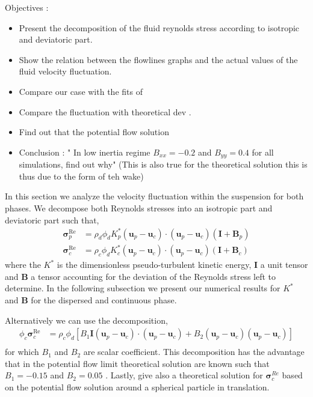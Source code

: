 
Objectives : 
\begin{itemize}
    \item Present the decomposition of the fluid reynolds stress according to isotropic and deviatoric part.
    \item Show the relation between the flowlines graphs and the actual values of the fluid velocity fluctuation.
    \item Compare our case with the fits of  \citet{almeras2019fluctuations} 
    \item Compare the fluctuation with theoretical dev \citet{lance1991turbulence,zhang1994ensemble}. 
    \item Find out that the potential flow solution 
    \item Conclusion : " In low inertia regime $B_{xx} = - 0.2$ and $B_{yy} = 0.4$ for all simulations, find out why" (This is also true for the theoretical solution\citep{lance1991turbulence} this is thus due to the form of teh wake)
\end{itemize}


In this section we analyze the velocity fluctuation within the suspension for both phases. 
We decompose both Reynolds stresses into an isotropic part and deviatoric part such that, 
\begin{align}
    \bm{\sigma}^{\text{Re}}_p &=  \rho_d \phi_d K^*_p(\textbf{u}_p - \textbf{u}_c)\cdot (\textbf{u}_p - \textbf{u}_c) 
    \left(
        \textbf{I}
        +\textbf{B}_p 
    \right)\\
    \bm{\sigma}^{\text{Re}}_c &=  \rho_c \phi_d K_c^*(\textbf{u}_p - \textbf{u}_c)\cdot (\textbf{u}_p - \textbf{u}_c) 
    \left(
        \textbf{I}
        +\textbf{B}_c
    \right)
\end{align}
where the $K^*$ is the dimensionless pseudo-turbulent  kinetic energy, $\textbf{I}$ a unit tensor and $\textbf{B}$ a tensor accounting for the deviation of the Reynolds stress left to determine. 
In the following subsection we present our numerical results for $K^*$ and $\textbf{B}$ for the dispersed and continuous phase. 

Alternatively we can use the decomposition,
\begin{align}
    \phi_c\bm{\sigma}^{\text{Re}}_c &=  \rho_c \phi_d 
    \left[
        B_1\textbf{I}(\textbf{u}_p - \textbf{u}_c)\cdot (\textbf{u}_p - \textbf{u}_c) 
        +B_2 (\textbf{u}_p - \textbf{u}_c) (\textbf{u}_p - \textbf{u}_c) 
    \right]\\
\end{align}
for which $B_1$ and $B_2$ are scalar coefficient. 
This decomposition has the advantage that in the potential flow limit theoretical solution are known such that  $B_1 = -0.15$ and  $B_2 = 0.05$ \citet{zhang1994averaged,wang2021numerical}. 
Lastly, \citet{lance1991turbulence} give also a theoretical solution for $\bm{\sigma}^{Re}_c$ based on the potential flow solution around a spherical particle in translation. 


